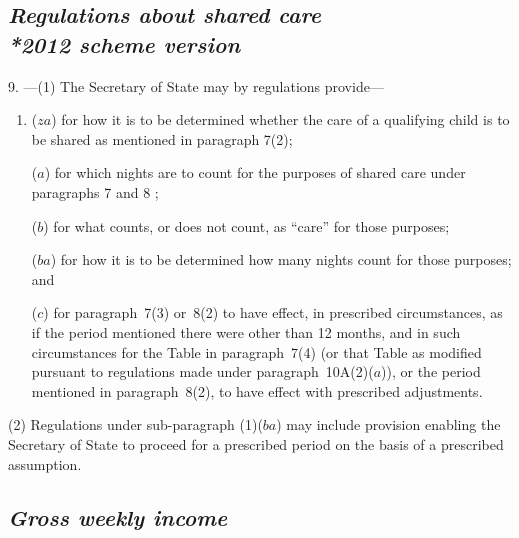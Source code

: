 \documentclass[12pt,a4paper]{article}
\begin{document}
\subsection*{\itshape Regulations about shared care\\*\emph{2012 scheme version}}

9.%
---(1)  %
The Secretary of State may by regulations provide—
\begin{enumerate}\item[]
($za$) for how it is to be determined whether the care of a qualifying child is to be shared as mentioned in paragraph 7(2);

($a$) for which nights are to count for the purposes of shared care under paragraphs 7 and 8%
;

($b$) for what counts, or does not count, as “care” for those purposes; 

($ba$) for how it is to be determined how many nights count for those purposes; and

($c$) for paragraph~7(3)  or~8(2)  to have effect, in prescribed circumstances, as if the period mentioned there were other than 12 months, and in such circumstances for the Table in paragraph~7(4)  (or that Table as modified pursuant to regulations made under paragraph~10A(2)($a$)), or the period mentioned in paragraph~8(2), to have effect with prescribed adjustments.
\end{enumerate}

(2) Regulations under sub-paragraph (1)($ba$) may include provision enabling the 
Secretary of State
to proceed for a prescribed period on the basis of a prescribed assumption. 


\subsection*{\itshape 
\emph{Gross}  %
 weekly income}
\end{document}
